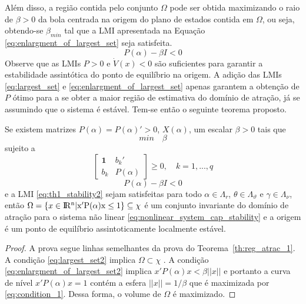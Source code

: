 Além disso, a região contida pelo conjunto $\Omega$ pode ser obtida maximizando o raio de $\beta > 0$ da bola centrada na origem do plano de estados contida em $\Omega$, ou seja, obtendo-se $\beta_{min}$ tal que a LMI apresentada na Equação \ref{eq:enlargment_of_largest_set} seja satisfeita.
\begin{equation}\label{eq:enlargment_of_largest_set}
P(\alpha) -  \beta I < 0
\end{equation}
Observe que as LMIs $P>0$ e $\dot{V}(x) < 0$ são suficientes para garantir a estabilidade assintótica do ponto de equilíbrio na origem. A adição das LMIs \ref{eq:largest_set} e \ref{eq:enlargment_of_largest_set} apenas garantem a obtenção de $P$ ótimo para a se obter a maior região de estimativa do domínio de atração, já se assumindo que o sistema é estável. Tem-se então o seguinte teorema proposto.
	\begin{theorem}\label{th:reg_atrac_2} 
		Se existem matrizes $P(\alpha) = P(\alpha)' > 0$, $X(\alpha)$, um  escalar $\beta >0$ tais que
		\begin{equation}\label{eq:condition_1}
		min \quad \beta
		\end{equation}
		sujeito a
		\begin{equation}\label{eq:largest_set2}
		\begin{bmatrix}\textbf{1}&b_k'\\b_k&P(\alpha)\end{bmatrix} \geq 0,\quad k = 1, ..., q
		\end{equation}
		\begin{equation}\label{eq:enlargment_of_largest_set2}
		P(\alpha) -  \beta I < 0
		\end{equation} 
		e a LMI \eqref{eq:th1_stability2} sejam satisfeitas
		para todo $\alpha \in \Lambda_r$, $\theta \in \Lambda_{\vartheta}$ e $\gamma \in\Lambda_{\nu}$, 
		então $\Omega = \{x\in\rm I\!R^{n}| x'P(\alpha)x \leq 1\}\subseteq \chi$ é um conjunto invariante do domínio de atração para o sistema não linear \ref{eq:nonlinear_system_cap_stability} e a origem é um ponto de equilíbrio assintoticamente localmente estável.
	\end{theorem}
	\begin{proof}
		A prova segue linhas semelhantes da prova do Teorema~\ref{th:reg_atrac_1}. 
		A condição \ref{eq:largest_set2} implica $\Omega \subset \chi$ \cite{bookboydl:1994}. A condição \ref{eq:enlargment_of_largest_set2}
		implica $ x'P(\alpha)x < \beta ||x||$ e portanto a curva de nível
		$x'P(\alpha)x=1$ contém a esfera $||x||=1/\beta$ que é maximizada
		por \ref{eq:condition_1}. Dessa forma, o volume de $\Omega$ é maximizado.
	\end{proof}

